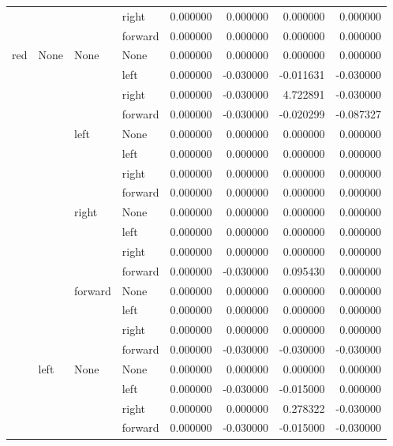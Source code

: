 \documentclass{article}
\begin{document}
\begin{longtable}{llllrrrr}
      &      &      & right &  0.000000 &  0.000000 &  0.000000 &  0.000000 \\
      &      &      & forward &  0.000000 &  0.000000 &  0.000000 &  0.000000 \\
red & None & None & None &  0.000000 &  0.000000 &  0.000000 &  0.000000 \\
      &      &      & left &  0.000000 & -0.030000 & -0.011631 & -0.030000 \\
      &      &      & right &  0.000000 & -0.030000 &  4.722891 & -0.030000 \\
      &      &      & forward &  0.000000 & -0.030000 & -0.020299 & -0.087327 \\
      &      & left & None &  0.000000 &  0.000000 &  0.000000 &  0.000000 \\
      &      &      & left &  0.000000 &  0.000000 &  0.000000 &  0.000000 \\
      &      &      & right &  0.000000 &  0.000000 &  0.000000 &  0.000000 \\
      &      &      & forward &  0.000000 &  0.000000 &  0.000000 &  0.000000 \\
      &      & right & None &  0.000000 &  0.000000 &  0.000000 &  0.000000 \\
      &      &      & left &  0.000000 &  0.000000 &  0.000000 &  0.000000 \\
      &      &      & right &  0.000000 &  0.000000 &  0.000000 &  0.000000 \\
      &      &      & forward &  0.000000 & -0.030000 &  0.095430 &  0.000000 \\
      &      & forward & None &  0.000000 &  0.000000 &  0.000000 &  0.000000 \\
      &      &      & left &  0.000000 &  0.000000 &  0.000000 &  0.000000 \\
      &      &      & right &  0.000000 &  0.000000 &  0.000000 &  0.000000 \\
      &      &      & forward &  0.000000 & -0.030000 & -0.030000 & -0.030000 \\
      & left & None & None &  0.000000 &  0.000000 &  0.000000 &  0.000000 \\
      &      &      & left &  0.000000 & -0.030000 & -0.015000 &  0.000000 \\
      &      &      & right &  0.000000 &  0.000000 &  0.278322 & -0.030000 \\
      &      &      & forward &  0.000000 & -0.030000 & -0.015000 & -0.030000 \\

\end{longtable}
\end{document}
